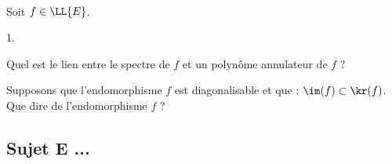 \documentclass[11pt]{article}%
\begin{document}
\begin{exerciceSP}~\\
  Soit $f \in \LL{E}$.
  \begin{noliste}{1.}
    \setlength{\itemsep}{2mm}
    \item Quel est le lien entre le spectre de $f$
    et un polynôme annulateur de $f$ ?
    
    \item Supposons que l'endomorphisme $f$ est diagonalisable et 
    que : $\im(f) \subset \kr(f)$.\\
    Que dire de l'endomorphisme $f$ ?
  \end{noliste}
\end{exerciceSP}


\newpage


\subsection*{Sujet E ...}
\end{document}
